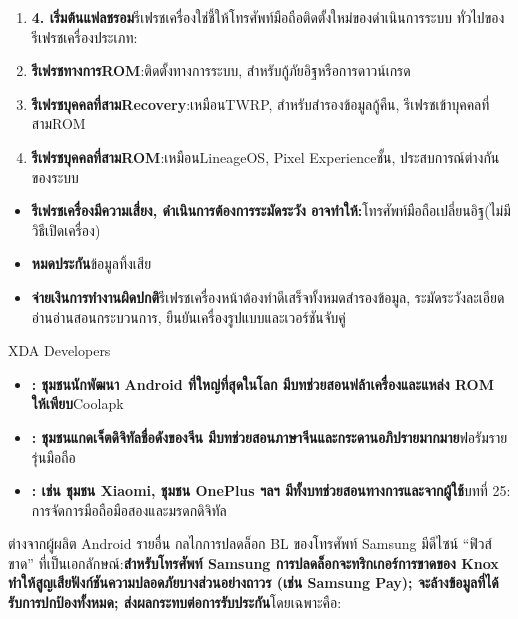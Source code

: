 
\begin{enumerate}
  \item \textbf{4. เริ่มต้นแฟลชรอม}รีเฟรชเครื่องใช่ชี้ให้โทรศัพท์มือถือติดตั้งใหม่ของดำเนินการระบบ ทั่วไปของรีเฟรชเครื่องประเภท:
  \item \textbf{รีเฟรชทางการROM}:ติดตั้งทางการระบบ, สำหรับกู้ภัยอิฐหรือการดาวน์เกรด
  \item \textbf{รีเฟรชบุคคลที่สามRecovery}:เหมือนTWRP, สำหรับสำรองข้อมูลกู้คืน, รีเฟรชเข้าบุคคลที่สามROM
  \item \textbf{รีเฟรชบุคคลที่สามROM}:เหมือนLineageOS, Pixel Experienceชั้น, ประสบการณ์ต่างกันของระบบ
\end{enumerate}


\begin{itemize}
  \item \textbf{รีเฟรชเครื่องมีความเสี่ยง, ดำเนินการต้องการระมัดระวัง อาจทำให้:}โทรศัพท์มือถือเปลี่ยนอิฐ(ไม่มีวิธีเปิดเครื่อง)
  \item \textbf{หมดประกัน}ข้อมูลทิ้งเสีย
  \item \textbf{จ่ายเงินการทำงานผิดปกติ}รีเฟรชเครื่องหน้าต้องทำดีเสร็จทั้งหมดสำรองข้อมูล, ระมัดระวังละเอียดอ่านอ่านสอนกระบวนการ, ยืนยันเครื่องรูปแบบและเวอร์ชันจับคู่
\end{itemize}


XDA Developers

\begin{itemize}
  \item \textbf{: ชุมชนนักพัฒนา Android ที่ใหญ่ที่สุดในโลก มีบทช่วยสอนฟล้าเครื่องและแหล่ง ROM ให้เพียบ}Coolapk
  \item \textbf{: ชุมชนแกดเจ็ตดิจิทัลชื่อดังของจีน มีบทช่วยสอนภาษาจีนและกระดานอภิปรายมากมาย}ฟอรัมรายรุ่นมือถือ
  \item \textbf{: เช่น ชุมชน Xiaomi, ชุมชน OnePlus ฯลฯ มีทั้งบทช่วยสอนทางการและจากผู้ใช้}บทที่ 25: การจัดการมือถือมือสองและมรดกดิจิทัล
\end{itemize}


ต่างจากผู้ผลิต Android รายอื่น กลไกการปลดล็อก BL ของโทรศัพท์ Samsung มีดีไซน์ “ฟิวส์ขาด” ที่เป็นเอกลักษณ์:\textbf{สำหรับโทรศัพท์ Samsung การปลดล็อกจะทริกเกอร์การขาดของ Knox ทำให้สูญเสียฟังก์ชันความปลอดภัยบางส่วนอย่างถาวร (เช่น Samsung Pay); จะล้างข้อมูลที่ได้รับการปกป้องทั้งหมด; ส่งผลกระทบต่อการรับประกัน}โดยเฉพาะคือ:

